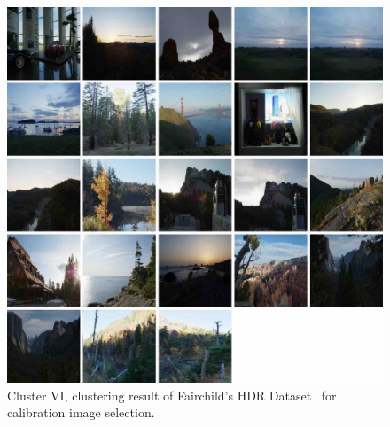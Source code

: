 \begin{figure}
\begin{center}
\includegraphics[width=\textwidth]{appendix1/cluster6_small.jpg}
\caption{Cluster VI, clustering result of Fairchild's HDR Dataset~\cite{fairchild2007hdr} for calibration image selection.}
\end{center}
\end{figure}